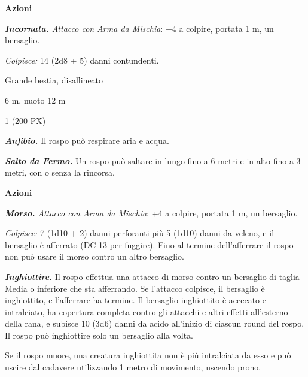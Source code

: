 \begin{multicols}{2}
{\textbf{Azioni}

\emph{\textbf{Incornata.} Attacco con Arma da Mischia}: +4 a colpire, portata 1 m, un bersaglio.

\emph{Colpisce:} 14 (2d8 + 5) danni contundenti.

\begin{description}[noitemsep, topsep=0pt, parsep=0pt, partopsep=0pt, itemsep=1pt, leftmargin=2.35cm,  labelwidth=2.2cm, itemindent=0cm, listparindent=0pt] %
\setlength{\baselineskip}{10pt}
\item[\textbf{Taglia/Tipo}] Grande bestia, disallineato
\item[\textbf{Caratt.}] 
\item[\textbf{Punti Ferita}] 
\item[\textbf{Tiri Salvez.}] 
\item[\textbf{Movimento}] 6 m, nuoto 12 m
\item[\textbf{Sfida}] 1 (200 PX)
\end{description}
\smallskip

\emph{\textbf{Anfibio.}} Il rospo può respirare aria e acqua.

\emph{\textbf{Salto da Fermo.}} Un rospo può saltare in lungo fino a 6 metri e in alto fino a 3 metri, con o senza la rincorsa.

\textbf{Azioni}

\emph{\textbf{Morso.} Attacco con Arma da Mischia}: +4 a colpire, portata 1 m, un bersaglio.

\emph{Colpisce:} 7 (1d10 + 2) danni perforanti più 5 (1d10) danni da veleno, e il bersaglio è afferrato (DC 13 per fuggire). Fino al termine dell'afferrare il rospo non può usare il morso contro un altro bersaglio.

\emph{\textbf{Inghiottire.}} Il rospo effettua una attacco di morso contro un bersaglio di taglia Media o inferiore che sta afferrando. Se l'attacco colpisce, il bersaglio è inghiottito, e l'afferrare ha termine. Il bersaglio inghiottito è accecato e intralciato, ha copertura completa contro gli attacchi e altri effetti all'esterno della rana, e subisce 10 (3d6) danni da acido all'inizio di ciascun round del rospo. Il rospo può inghiottire solo un bersaglio alla volta.

Se il rospo muore, una creatura inghiottita non è più intralciata da esso e può uscire dal cadavere utilizzando 1 metro di movimento, uscendo prono.

}
\end{multicols}
